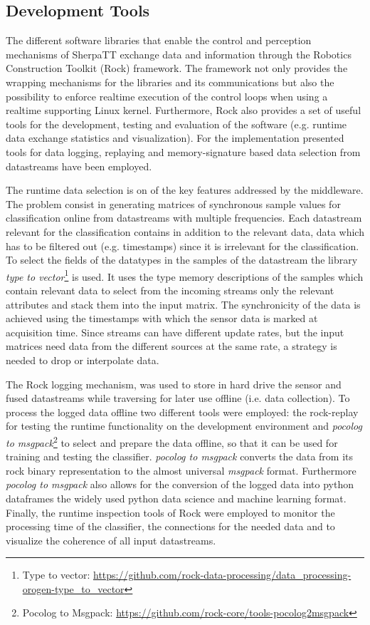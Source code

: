 \documentclass{article}
\begin{document}
\subsection{Development Tools}

The different software libraries that enable the control and perception mechanisms of SherpaTT exchange data and information through the Robotics Construction Toolkit (Rock) framework.
The framework not only provides the wrapping mechanisms for the libraries and its communications but also the possibility to enforce realtime execution of the control loops when using a realtime supporting Linux kernel.
Furthermore, Rock also provides a set of useful tools for the development, testing and evaluation of the software (e.g. runtime data exchange statistics and visualization). 
For the implementation presented tools for data logging, replaying and memory-signature based data selection from datastreams have been employed.

The runtime data selection is on of the key features addressed by the middleware. 
The problem consist in generating matrices of synchronous sample values for classification online from datastreams with multiple frequencies.
Each datastream relevant for the classification contains in addition to the relevant data, data which has to be filtered out (e.g. timestamps) since it is irrelevant for the classification.
To select the fields of the datatypes in the samples of the datastream the library \emph{type to vector}\footnote{Type to vector: \url{https://github.com/rock-data-processing/data_processing-orogen-type_to_vector}} is used.
It uses the type memory descriptions of the samples which contain relevant data to select from the incoming streams only the relevant attributes and stack them into the input matrix. 
The synchronicity of the data is achieved using the timestamps with which the sensor data is marked at acquisition time.
Since streams can have different update rates, but the input matrices need data from the different sources at the same rate, a strategy is needed to drop or interpolate data. 

The Rock logging mechanism, was used to store in hard drive the sensor and fused datastreams while traversing for later use offline (i.e. data collection). 
To process the logged data offline two different tools were employed: the rock-replay for testing the runtime functionality on the development environment and \emph{pocolog to msgpack}\footnote{Pocolog to Msgpack: \url{https://github.com/rock-core/tools-pocolog2msgpack}} to select and prepare the data offline, so that it can be used for training and testing the classifier.
\emph{pocolog to msgpack} converts the data from its rock binary representation to the almost universal \emph{msgpack} format.
Furthermore \emph{pocolog to msgpack} also allows for the conversion of the logged data into python dataframes the widely used python data science and machine learning format. 
Finally, the runtime inspection tools of Rock were employed to monitor the processing time of the classifier, the connections for the needed data and to visualize the coherence of all input datastreams. 
\end{document}
